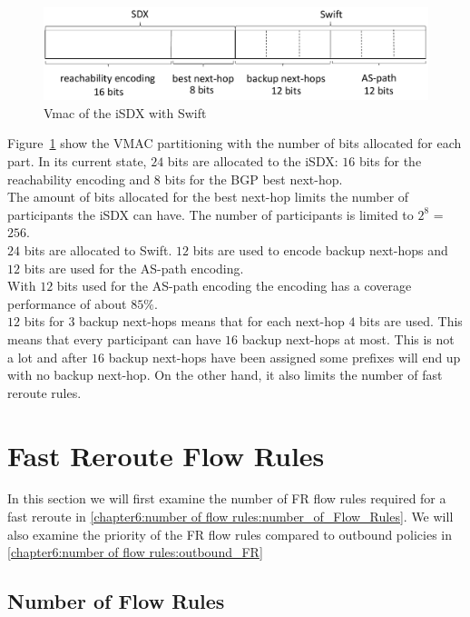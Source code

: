 \begin{figure}[h]
\center
\includegraphics[scale = 0.65]{Figures/eval_vmac_cropped2.pdf}
\caption{Vmac of the iSDX with Swift}
\label{fig:discussion_VMAC}
\end{figure}

Figure~\ref{fig:discussion_VMAC} show the VMAC partitioning with the number of bits allocated for each part. 
In its current state, $24$ bits are allocated to the iSDX: $16$ bits for the reachability encoding and $8$ bits for the BGP best next-hop. \\
The amount of bits allocated for the best next-hop limits the number of participants the iSDX can have. The number of participants is limited to $2^8$ = $256$. \\
$24$ bits are allocated to Swift. $12$ bits are used to encode backup next-hops and $12$ bits are used for the AS-path encoding. \\
With $12$ bits used for the AS-path encoding the encoding has a coverage performance of about $85\%$. \cite{swift}\\
$12$ bits for $3$ backup next-hops means that for each next-hop $4$ bits are used. This means that every participant can have $16$ backup next-hops at most. This is not a lot and after $16$ backup next-hops have been assigned some prefixes will end up with no backup next-hop. On the other hand, it also limits the number of fast reroute rules. \\

\section{\label{chapter6:number of flow rules}Fast Reroute Flow Rules}

In this section we will first examine the number of FR flow rules required for a fast reroute in \ref{chapter6:number of flow rules:number_of_Flow_Rules}. We will also examine the priority of the FR flow rules compared to outbound policies in \ref{chapter6:number of flow rules:outbound_FR}

\subsection{\label{chapter6:number of flow rules:number_of_Flow_Rules}Number of Flow Rules}

